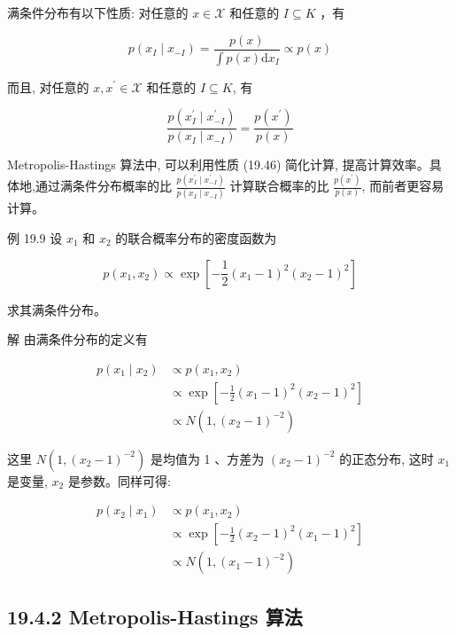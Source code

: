 \documentclass[10pt]{article}
\begin{document}
\begin{CJK*}{UTF8}{bsmi}
满条件分布有以下性质: 对任意的 $x \in \mathcal{X}$ 和任意的 $I \subseteq K$ ，有


\begin{equation*}
p\left(x_{I} \mid x_{-I}\right)=\frac{p(x)}{\int p(x) \mathrm{d} x_{I}} \propto p(x) \tag{19.45}
\end{equation*}


而且, 对任意的 $x, x^{\prime} \in \mathcal{X}$ 和任意的 $I \subseteq K$, 有


\begin{equation*}
\frac{p\left(x_{I}^{\prime} \mid x_{-I}^{\prime}\right)}{p\left(x_{I} \mid x_{-I}\right)}=\frac{p\left(x^{\prime}\right)}{p(x)} \tag{19.46}
\end{equation*}


Metropolis-Hastings 算法中, 可以利用性质 (19.46) 简化计算, 提高计算效率。具体地,通过满条件分布概率的比 $\frac{p\left(x_{I}^{\prime} \mid x_{-I}^{\prime}\right)}{p\left(x_{I} \mid x_{-I}\right)}$ 计算联合概率的比 $\frac{p\left(x^{\prime}\right)}{p(x)}$, 而前者更容易计算。

例 19.9 设 $x_{1}$ 和 $x_{2}$ 的联合概率分布的密度函数为

$$
p\left(x_{1}, x_{2}\right) \propto \exp \left[-\frac{1}{2}\left(x_{1}-1\right)^{2}\left(x_{2}-1\right)^{2}\right]
$$

求其满条件分布。

解 由满条件分布的定义有

$$
\begin{aligned}
p\left(x_{1} \mid x_{2}\right) & \propto p\left(x_{1}, x_{2}\right) \\
& \propto \exp \left[-\frac{1}{2}\left(x_{1}-1\right)^{2}\left(x_{2}-1\right)^{2}\right] \\
& \propto N\left(1,\left(x_{2}-1\right)^{-2}\right)
\end{aligned}
$$

这里 $N\left(1,\left(x_{2}-1\right)^{-2}\right)$ 是均值为 1 、方差为 $\left(x_{2}-1\right)^{-2}$ 的正态分布, 这时 $x_{1}$ 是变量, $x_{2}$ 是参数。同样可得:

$$
\begin{aligned}
p\left(x_{2} \mid x_{1}\right) & \propto p\left(x_{1}, x_{2}\right) \\
& \propto \exp \left[-\frac{1}{2}\left(x_{2}-1\right)^{2}\left(x_{1}-1\right)^{2}\right] \\
& \propto N\left(1,\left(x_{1}-1\right)^{-2}\right)
\end{aligned}
$$

\subsection*{19.4.2 Metropolis-Hastings 算法}

\end{CJK*}
\end{document}
